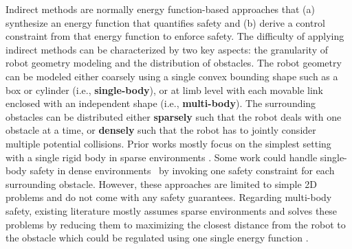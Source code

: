 
Indirect methods are normally energy function-based approaches \cite{wei2019unified} that (a) synthesize an energy function that quantifies safety and (b) derive a control constraint from that energy function to enforce safety.
The difficulty of applying indirect methods can be characterized by two key aspects: the granularity of robot geometry modeling and the distribution of obstacles.
The robot geometry can be modeled either coarsely using a single convex bounding shape such as a box or cylinder (i.e., \textbf{single-body}), or at limb level with each movable link enclosed with an independent shape (i.e., \textbf{multi-body}).
The surrounding obstacles can be distributed either \textbf{sparsely} such that the robot deals with one obstacle at a time, or \textbf{densely} such that the robot has to jointly consider multiple potential collisions.
Prior works mostly focus on the simplest setting with a single rigid body in sparse environments \cite{yun2024safe, he2024agile, singletary2022onboard, pandya2024multimodal, molnar2021model, zhao2021zeroviolation, choi2023constraint}.
Some work could handle single-body safety in dense environments~\cite{chen2021safe, dawson2022safe, zheng2022clustered} by invoking one safety constraint for each surrounding obstacle. However, these approaches are limited to simple 2D problems and do not come with any safety guarantees. 
Regarding multi-body safety, existing literature mostly assumes sparse environments and solves these problems by reducing them to maximizing the closest distance from the robot to the obstacle which could be regulated using one single energy function \cite{liu2023proactive, lin2017real, liu2022safe}.

